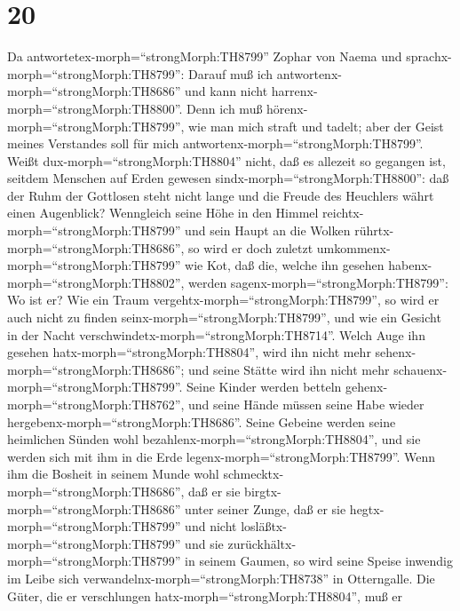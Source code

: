 \hypertarget{section-19}{%
\section{20}\label{section-19}}

 Da antwortetex-morph=``strongMorph:TH8799'' Zophar von
Naema und sprachx-morph=``strongMorph:TH8799'':  Darauf muß
ich antwortenx-morph=``strongMorph:TH8686'' und kann nicht
harrenx-morph=``strongMorph:TH8800''.  Denn ich muß
hörenx-morph=``strongMorph:TH8799'', wie man mich straft und tadelt;
aber der Geist meines Verstandes soll für mich
antwortenx-morph=``strongMorph:TH8799''.  Weißt
dux-morph=``strongMorph:TH8804'' nicht, daß es allezeit so gegangen ist,
seitdem Menschen auf Erden gewesen sindx-morph=``strongMorph:TH8800'':
 daß der Ruhm der Gottlosen steht nicht lange und die Freude
des Heuchlers währt einen Augenblick?  Wenngleich seine Höhe
in den Himmel reichtx-morph=``strongMorph:TH8799'' und sein Haupt an die
Wolken rührtx-morph=``strongMorph:TH8686'',  so wird er doch
zuletzt umkommenx-morph=``strongMorph:TH8799'' wie Kot, daß die, welche
ihn gesehen habenx-morph=``strongMorph:TH8802'', werden
sagenx-morph=``strongMorph:TH8799'': Wo ist er?  Wie ein
Traum vergehtx-morph=``strongMorph:TH8799'', so wird er auch nicht zu
finden seinx-morph=``strongMorph:TH8799'', und wie ein Gesicht in der
Nacht verschwindetx-morph=``strongMorph:TH8714''.  Welch
Auge ihn gesehen hatx-morph=``strongMorph:TH8804'', wird ihn nicht mehr
sehenx-morph=``strongMorph:TH8686''; und seine Stätte wird ihn nicht
mehr schauenx-morph=``strongMorph:TH8799''.  Seine Kinder
werden betteln gehenx-morph=``strongMorph:TH8762'', und seine Hände
müssen seine Habe wieder hergebenx-morph=``strongMorph:TH8686''.
 Seine Gebeine werden seine heimlichen Sünden wohl
bezahlenx-morph=``strongMorph:TH8804'', und sie werden sich mit ihm in
die Erde legenx-morph=``strongMorph:TH8799''.  Wenn ihm die
Bosheit in seinem Munde wohl schmecktx-morph=``strongMorph:TH8686'', daß
er sie birgtx-morph=``strongMorph:TH8686'' unter seiner Zunge,
 daß er sie hegtx-morph=``strongMorph:TH8799'' und nicht
losläßtx-morph=``strongMorph:TH8799'' und sie
zurückhältx-morph=``strongMorph:TH8799'' in seinem Gaumen, 
so wird seine Speise inwendig im Leibe sich
verwandelnx-morph=``strongMorph:TH8738'' in Otterngalle. 
Die Güter, die er verschlungen hatx-morph=``strongMorph:TH8804'', muß er
